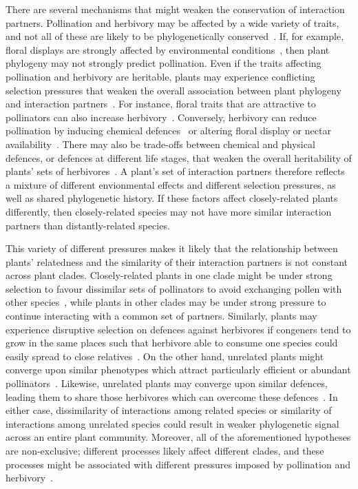 \documentclass[12pt]{article}
\begin{document}
\begin{spacing}{1.5}
  There are several mechanisms that might weaken the conservation of interaction partners. Pollination and herbivory may be affected
  by a wide variety of traits, and not all of these are likely to be
  phylogenetically conserved~\citep{Rezende2007,Kursar2009,Ibanez2016}. If, for example,
  floral displays are strongly affected by environmental conditions~\citep{Canto2004}, 
  then plant phylogeny may not strongly predict pollination.
  Even if the traits affecting pollination and herbivory are
  heritable, plants may experience conflicting selection pressures that
  weaken the overall association between plant phylogeny and interaction
  partners~\citep{Armbruster1997,Lankau2007,Siepielski2010,Wise2013,Karinho2014}. 
  For instance, floral traits that
  are attractive to pollinators can also increase 
  herbivory~\citep{Strauss2002,Adler2004,Strauss2006,Theis2006}. 
  Conversely, herbivory can reduce pollination by inducing chemical 
  defences~\citep{Adler2006} or altering floral display or nectar 
  availability~\citep{Strauss1997}. 
  There may also be trade-offs between chemical and physical defences, or defences at different life stages, that weaken the overall heritability of plants' sets of herbivores~\citep{Karinho2014,Endara2017}. 
  A plant's set of interaction partners therefore reflects a mixture of different envionmental effects and different selection pressures, as well as shared phylogenetic history.
  If these factors affect closely-related plants differently, then closely-related species may not have more similar interaction partners than distantly-related species.


  This variety of different pressures makes it likely that the relationship between plants' relatedness and the similarity of their interaction partners is
  not constant across plant clades. 
  Closely-related plants in one clade might be under strong selection to favour dissimilar sets of pollinators to avoid exchanging pollen with other species~\citep{Levin1970,Bell2005,Mitchell2009}, while plants in other clades may be under strong pressure to continue interacting with a common set of partners. 
  Similarly, plants may experience disruptive selection on defences against herbivores if congeners tend to grow in the same places such that herbivore able to consume one species could easily spread to close relatives~\citep{Kursar2009,Yguel2014}. 
  On the other hand, unrelated plants might 
  converge upon similar phenotypes which attract particularly 
  efficient or abundant pollinators~\citep{Ollerton1996,Wilson2007,Ollerton2009,Ibanez2016}. 
  Likewise, unrelated plants may converge upon similar defences, leading them to share 
  those herbivores which can overcome these defences~\citep{Pichersky2000}. 
  In either case, dissimilarity of interactions among related species 
  or similarity of interactions among unrelated species could result 
  in weaker phylogenetic signal across an entire plant community. 
  Moreover, all of the aforementioned hypotheses 
  are non-exclusive; different processes likely affect different
  clades, and these processes might be associated with different 
  pressures imposed by pollination and herbivory~\citep{Fontaine2015}. 



\end{spacing}
\end{document}
